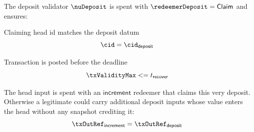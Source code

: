 \noindent The deposit validator $\nuDeposit$ is spent with
$\redeemerDeposit = \mathsf{Claim}$ and ensures:
\begin{menumerate}
	\item Claiming head id matches the deposit datum
	\[
		\cid = \cid_{\mathsf{deposit}}
	\]
	\item Transaction is posted before the deadline
	\[
		\txValidityMax <= t_{\mathsf{recover}}
	\]
	\item The head input is spent with an $\mathsf{increment}$ redeemer that
	claims this very deposit. Otherwise a legitimate \mtxIncrement{} could carry
	additional deposit inputs whose value enters the head without any snapshot
	crediting it:
	\[
		\txOutRef_{\mathsf{increment}} = \txOutRef_{\mathsf{deposit}}
	\]
\end{menumerate}

